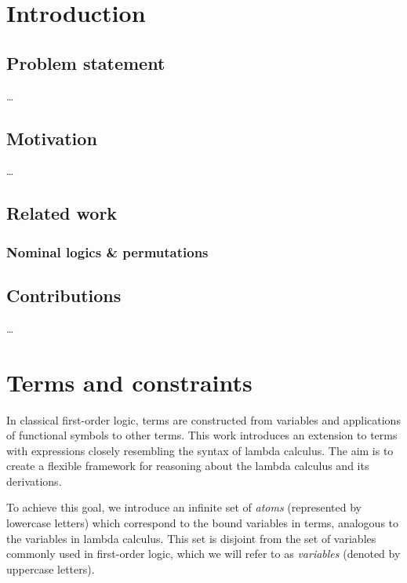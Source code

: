 \documentclass[english, mgr]{iithesis}
\author         {Dominik Gulczyński}
\date           {\today}                     %
\begin{document}
\chapter{Introduction}

\section{Problem statement}
\dots

\section{Motivation}
\dots

\section{Related work}
\subsection{Nominal logics \& permutations}

\section{Contributions}
\dots

\chapter{Terms and constraints}

In classical first-order logic, terms are constructed from variables and applications of functional symbols to other terms. This work introduces an extension to terms with expressions closely resembling the syntax of lambda calculus. The aim is to create a flexible framework for reasoning about the lambda calculus and its derivations.

To achieve this goal, we introduce an infinite set of \textit{atoms} (represented by lowercase letters) which correspond to the bound variables in terms, analogous to the variables in lambda calculus. This set is disjoint from the set of variables commonly used in first-order logic, which we will refer to as \textit{variables} (denoted by uppercase letters).
\end{document}
